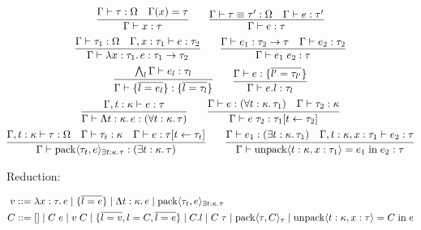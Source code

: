 \begin{gather*}
  \infer{\Gamma \vdash x: \tau}{
    \Gamma \vdash \tau: \Omega
    &
    \Gamma(x) = \tau
  }
  \hspace{2em}
  \infer{\Gamma \vdash e: \tau}{
    \Gamma \vdash \tau \equiv \tau': \Omega
    &
    \Gamma \vdash e: \tau'
  }
  \\
  \infer{\Gamma \vdash \lambda x: \tau_1\ldotp e: \tau_1 \to \tau_2}{
    \Gamma \vdash \tau_1: \Omega
    &
    \Gamma, x: \tau_1 \vdash e: \tau_2
  }
  \hspace{2em}
  \infer{\Gamma \vdash e_1\; e_2: \tau}{
    \Gamma \vdash e_1: \tau_2 \to \tau
    &
    \Gamma \vdash e_2: \tau_2
  }
  \\
  \infer{\Gamma \vdash \{\overline{l = e_l}\}: \{\overline{l = \tau_l}\}}{
    \bigwedge_l \Gamma \vdash e_l: \tau_l
  }
  \hspace{2em}
  \infer{\Gamma \vdash e.l: \tau_l}{
    \Gamma \vdash e: \{\overline{l' = \tau_{l'}}\}
  }
  \\
  \infer{\Gamma \vdash \Lambda t: \kappa\ldotp e: (\forall t: \kappa\ldotp \tau)}{
    \Gamma, t: \kappa \vdash e: \tau
  }
  \hspace{2em}
  \infer{\Gamma \vdash e\; \tau_2: \tau_1[t \assign \tau_2]}{
    \Gamma \vdash e: (\forall t: \kappa\ldotp \tau_1)
    &
    \Gamma \vdash \tau_2: \kappa
  }
  \\
  \infer{\Gamma \vdash \sympack \langle \tau_t, e\rangle_{\exists t: \kappa\ldotp \tau}: (\exists t: \kappa\ldotp \tau)}{
    \Gamma, t: \kappa \vdash \tau: \Omega
    &
    \Gamma \vdash \tau_t: \kappa
    &
    \Gamma \vdash e: \tau[t \assign \tau_t]
  }
  \hspace{2em}
  \infer{\Gamma \vdash \symunpack \langle t: \kappa, x: \tau_1\rangle = e_1 \symin e_2: \tau}{
    \Gamma \vdash e_1: (\exists t: \kappa\ldotp \tau_1)
    &
    \Gamma, t: \kappa, x: \tau_1 \vdash e_2: \tau
  }
\end{gather*}

Reduction:

\begin{align*}
  v
  &\mathrel{::=} \lambda x: \tau\ldotp e
  \mid \{\overline{l = e}\}
  \mid \Lambda t: \kappa\ldotp e
  \mid \mathop{\mathrm{pack}} \langle \tau_t, e\rangle_{\exists t: \kappa\ldotp \tau}
  \\
  C
  &\mathrel{::=} []
  \mid C\; e
  \mid v\; C
  \mid \{\overline{l = v}, l = C, \overline{l = e}\}
  \mid C.l
  \mid C\; \tau
  \mid \mathop{\mathrm{pack}} \langle \tau, C\rangle_\tau
  \mid \mathop{\mathrm{unpack}} \langle t: \kappa, x: \tau\rangle = C \mathrel{\mathrm{in}} e
\end{align*}

